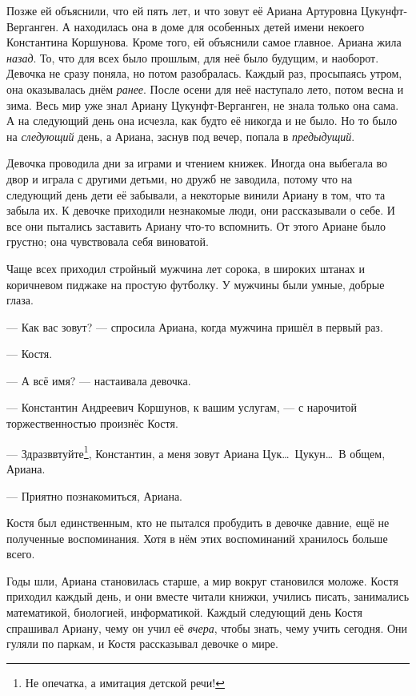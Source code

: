 \documentclass[openany, oneside]{book}
\begin{document}
Позже ей объяснили, что ей пять лет, и что зовут её Ариана Артуровна Цукунфт-Верганген. А находилась она в доме для особенных детей имени некоего Константина Коршунова. Кроме того, ей объяснили самое главное. Ариана жила \textit{назад}. То, что для всех было прошлым, для неё было будущим, и наоборот. Девочка не сразу поняла, но потом разобралась. Каждый раз, просыпаясь утром, она оказывалась днём \textit{ранее}. После осени для неё наступало лето, потом весна и зима. Весь мир уже знал Ариану Цукунфт-Верганген, не знала только она сама. А на следующий день она исчезла, как будто её никогда и не было. Но то было на \textit{следующий} день, а Ариана, заснув под вечер, попала в \textit{предыдущий}.

Девочка проводила дни за играми и чтением книжек. Иногда она выбегала во двор и играла с другими детьми, но дружб не заводила, потому что на следующий день дети её забывали, а некоторые винили Ариану в том, что та забыла их. К девочке приходили незнакомые люди, они рассказывали о себе. И все они пытались заставить Ариану что-то вспомнить. От этого Ариане было грустно; она чувствовала себя виноватой.

Чаще всех приходил стройный мужчина лет сорока, в широких штанах и коричневом пиджаке на простую футболку. У мужчины были умные, добрые глаза.

--- Как вас зовут? --- спросила Ариана, когда мужчина пришёл в первый раз.

--- Костя.

--- А всё имя? --- настаивала девочка.

--- Константин Андреевич Коршунов, к вашим услугам, --- с нарочитой торжественностью произнёс Костя.

--- Здразввтуйте\footnote{Не опечатка, а имитация детской речи!}, Константин, а меня зовут Ариана Цук\dots \ Цукун\dots \ В общем, Ариана.

--- Приятно познакомиться, Ариана.

Костя был единственным, кто не пытался пробудить в девочке давние, ещё не полученные воспоминания. Хотя в нём этих воспоминаний хранилось больше всего.

Годы шли, Ариана становилась старше, а мир вокруг становился моложе. Костя приходил каждый день, и они вместе читали книжки, учились писать, занимались математикой, биологией, информатикой. Каждый следующий день Костя спрашивал Ариану, чему он учил её \textit{вчера}, чтобы знать, чему учить сегодня. Они гуляли по паркам, и Костя рассказывал девочке о мире.
\end{document}
